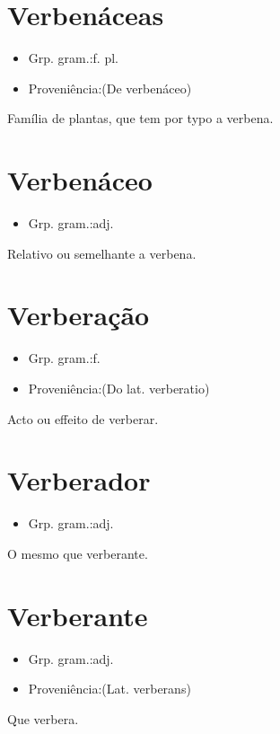 \documentclass{article}
\begin{document}
\section{Verbenáceas}
\begin{itemize}
\item {Grp. gram.:f. pl.}
\end{itemize}
\begin{itemize}
\item {Proveniência:(De \textunderscore verbenáceo\textunderscore )}
\end{itemize}
Família de plantas, que tem por typo a verbena.
\section{Verbenáceo}
\begin{itemize}
\item {Grp. gram.:adj.}
\end{itemize}
Relativo ou semelhante a verbena.
\section{Verberação}
\begin{itemize}
\item {Grp. gram.:f.}
\end{itemize}
\begin{itemize}
\item {Proveniência:(Do lat. \textunderscore verberatio\textunderscore )}
\end{itemize}
Acto ou effeito de verberar.
\section{Verberador}
\begin{itemize}
\item {Grp. gram.:adj.}
\end{itemize}
O mesmo que \textunderscore verberante\textunderscore .
\section{Verberante}
\begin{itemize}
\item {Grp. gram.:adj.}
\end{itemize}
\begin{itemize}
\item {Proveniência:(Lat. \textunderscore verberans\textunderscore )}
\end{itemize}
Que verbera.
\end{document}
